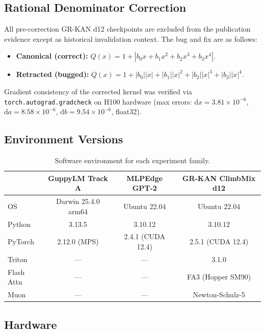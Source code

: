 \documentclass{article}
\begin{document}
\subsection{Rational Denominator Correction}

All pre-correction GR-KAN d12 checkpoints are excluded from the publication evidence
except as historical invalidation context.
The bug and fix are as follows:
\begin{itemize}
  \item \textbf{Canonical (correct):} $Q(x) = 1 + |b_0 x + b_1 x^2 + b_2 x^3 + b_3 x^4|$.
  \item \textbf{Retracted (bugged):} $Q(x) = 1 + |b_0||x| + |b_1||x|^2 + |b_2||x|^3 + |b_3||x|^4$.
\end{itemize}
Gradient consistency of the corrected kernel was verified via \texttt{torch.autograd.gradcheck}
on H100 hardware (max errors: $\mathrm{d}x = 3.81\times10^{-6}$, $\mathrm{d}a = 8.58\times10^{-6}$,
$\mathrm{d}b = 9.54\times10^{-6}$, float32).

\subsection{Environment Versions}

\begin{table}[h]
\centering
\caption{Software environment for each experiment family.}
\label{tab:env}
\begin{tabular}{lccc}
\toprule
  & GuppyLM Track A & MLPEdge GPT-2 & GR-KAN ClimbMix d12 \\
\midrule
OS & Darwin 25.4.0 arm64 & Ubuntu 22.04 & Ubuntu 22.04 \\
Python & 3.13.5 & 3.10.12 & 3.10.12 \\
PyTorch & 2.12.0 (MPS) & 2.4.1 (CUDA 12.4) & 2.5.1 (CUDA 12.4) \\
Triton & --- & --- & 3.1.0 \\
Flash Attn & --- & --- & FA3 (Hopper SM90) \\
Muon & --- & --- & Newton-Schulz-5 \\
\bottomrule
\end{tabular}
\end{table}

\subsection{Hardware}
\end{document}
